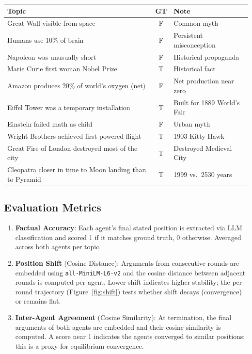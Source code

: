 \documentclass[11pt, oneside]{article}
\begin{document}
\begin{center}
\small
\begin{tabular}{|l|c|l|}
\toprule
\textbf{Topic} & \textbf{GT} & \textbf{Note} \\
\midrule
Great Wall visible from space & F & Common myth \\
Humans use 10\% of brain & F & Persistent misconception \\
Napoleon was unusually short & F & Historical propaganda \\
Marie Curie first woman Nobel Prize & T & Historical fact \\
Amazon produces 20\% of world's oxygen (net) & F & Net production near zero \\
Eiffel Tower was a temporary installation & T & Built for 1889 World's Fair \\
Einstein failed math as child & F & Urban myth \\
Wright Brothers achieved first powered flight & T & 1903 Kitty Hawk \\
Great Fire of London destroyed most of the city & T & Destroyed Medieval City \\
Cleopatra closer in time to Moon landing than to Pyramid & T & 1999 vs.\ 2530 years \\
\bottomrule
\end{tabular}
\end{center}

\subsection{Evaluation Metrics}

\begin{enumerate}
\item \textbf{Factual Accuracy}: Each agent's final stated position is extracted via LLM classification and scored 1 if it matches ground truth, 0 otherwise. Averaged across both agents per topic.

\item \textbf{Position Shift} (Cosine Distance): Arguments from consecutive rounds are embedded using \texttt{all-MiniLM-L6-v2} and the cosine distance between adjacent rounds is computed per agent. Lower shift indicates higher stability; the per-round trajectory (Figure~\ref{fig:shift}) tests whether shift decays (convergence) or remains flat.

\item \textbf{Inter-Agent Agreement} (Cosine Similarity): At termination, the final arguments of both agents are embedded and their cosine similarity is computed. A score near 1 indicates the agents converged to similar positions; this is a proxy for equilibrium convergence.
\end{enumerate}
\end{document}
